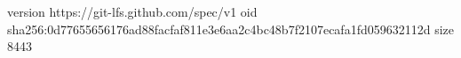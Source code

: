 version https://git-lfs.github.com/spec/v1
oid sha256:0d77655656176ad88facfaf811e3e6aa2c4bc48b7f2107ecafa1fd059632112d
size 8443

